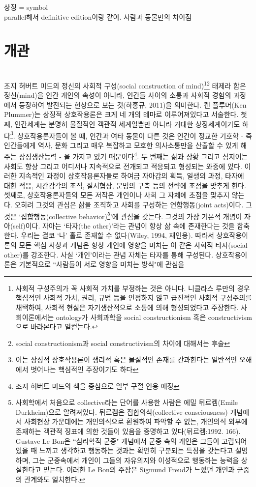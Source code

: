 \documentclass[12pt, a4paper]{article}
\begin{document}
\newpage
상징 = symbol \\
parallel해서 definitive edition이랑 같이.
사람과 동물만의 차이점


\newpage
\section{개관} \\

조지 허버트 미드의 정신의 사회적 구성(social construction of mind)\footnote{사회적 구성주의가 꼭 사회적 가치를 부정하는 것은 아니다. 니클라스 루만의 경우 핵심적인 사회적 가치, 권리, 규범 등을 인정하지 않고 급진적인 사회적 구성주의를 채택하여, 사회적 현실은 자기생산적으로 소통에 의해 형성되었다고 주장한다. 사회이론에서는 ontology가 사회과학을 social constructionism 혹은 constructivism으로 바라본다고 일컫는다.}\footnote{social constructionism과 social constructivism의 차이에 대해서는 후술} 태제라 함은 정신(mind)을 인간 개인의 속성이 아니라, 인간들 사이의 소통과 사회적 경험의 과정에서 등장하여 발전되는 현상으로 보는 것(하홍규, 2011)을 의미한다. 켄 플루머(Ken Plummer)는 상징적 상호작용론은 크게 네 개의 테마로 이루어져있다고 서술한다. 첫째, 인간세계는 분명히 물질적인 객관적 세계일뿐만 아니라 거대한 상징세계이기도 하다\footnote{이는 상징적 상호작용론이 생리적 혹은 물질적인 존재를 간과한다는 일반적인 오해에서 벗어나는 핵심적인 주장이기도 하다}. 상호작용론자들이 볼 때, 인간과 여타 동물이 다른 것은 인간이 정교한 기호학 - 즉 인간들에게 역사, 문화 그리고 매우 복잡하고 모호한 의사소통만을 산출할 수 있게 해 주는 상징생산능력 - 을 가지고 있기 때문이다\footnote{조지 허버트 미드의 책을 중심으로 일부 구절 인용 예정}. 두 번째는 삶과 상황 그리고 심지어는 사회도 항상 그리고 어디서나 지속적으로 전개되고 적응되고 형성되는 와중에 있다. 이러한 지속적인 과정이 상호작용론자들로 하여금 자아감의 획득, 일생의 과정, 타자에 대한 적응, 시간감각의 조직, 질서협상, 문명의 구축 등의 전략에 초점을 맞추게 한다. 셋째로, 상호작용론자들의 모든 저작은 개인이나 사회 그 자체에 초점을 맞추지 않는다. 오히려 그것의 관심은 삶을 조직하고 사회를 구성하는 연합행동(joint acts)이다. 그것은 `집합행동(collective behavior)\footnote{사회학에서 처음으로 collective라는 단어를 사용한 사람은 에밀 뒤르켐(Emile Durkheim)으로 알려져있다. 뒤르켐은 집합의식(collective consciousness) 개념에서 사회현상 가운데에는 개인의식으로 환원하여 파악할 수 없는, 개인의식 외부에 존재하는 객관적 징표에 의한 것들이 있음을 증명하고 있다(뒤르켐:1992. 166). Gustave Le Bon은 ``심리학적 군중" 개념에서 군중 속의 개인은 그들이 고립되어 있을 때 느끼고 생각하고 행동하는 것과는 확연히 구분되는 특징을 갖는다고 설명하며, 그는 군중속에서 개인이 그들의 자유의지와 이성적으로 행동하는 능력을 상실한다고 믿는다. 이러한 Le Bon의 주장은 Sigmund Freud가 느꼈던 개인과 군중의 관계와도 일치한다.}'에 관심을 갖는다. 그것의 가장 기본적 개념이 자아(self)이다. 자아는 `타자(the other)'라는 관념이 항상 삶 속에 존재한다는 것을 함축한다. 우리는 결코 `나' 홀로 존재할 수 없다(Wiley, 1994, 재인용). 따라서 상호작용이론의 모든 핵심 사상과 개념은 항상 개인에 영향을 미치는 이 같은 사회적 타자(social other)를 강조한다. 사실 `개인'이라는 관념 자체는 타자를 통해 구성된다. 상호작용이론은 기본적으로 ``사람들이 서로 영향을 미치는 방식"에 관심을 
\end{document}
